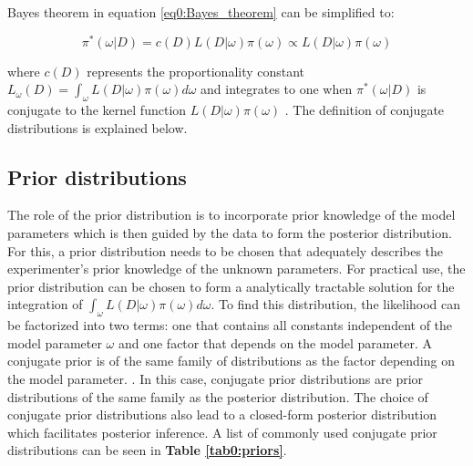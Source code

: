 Bayes theorem in equation \ref{eq0:Bayes_theorem} can be simplified to:

\begin{equation}
\pi^*(\omega|D)=c(D)L(D|\omega)\pi(\omega)\propto{}L(D|\omega)\pi(\omega)
\end{equation} 

where $c(D)$ represents the proportionality constant $L_\omega(D)=\int_\omega{}L(D|\omega)\pi(\omega)d\omega$ and integrates to one when $\pi^*(\omega|D)$ is conjugate to the kernel function $L(D|\omega)\pi(\omega)$ \citep{Bernardo2003, Raiffa1961}. The definition of conjugate distributions is explained below.  

\newpage

\subsection{Prior distributions}

The role of the prior distribution is to incorporate prior knowledge of the model parameters which is then guided by the data to form the posterior distribution. For this, a prior distribution needs to be chosen that adequately describes the experimenter's prior knowledge of the unknown parameters. For practical use, the prior distribution can be chosen to form a analytically tractable solution for the integration of $\int_\omega{}L(D|\omega)\pi(\omega)d\omega$. To find this distribution, the likelihood can be factorized into two terms: one that contains all constants independent of the model parameter $\omega$ and one factor that depends on the model parameter. A conjugate prior is of the same family of distributions as the factor depending on the model parameter. \citep{Fink1997}. In this case, conjugate prior distributions are prior distributions of the same family as the posterior distribution. The choice of conjugate prior distributions also lead to a closed-form posterior distribution which facilitates posterior inference. A list of commonly used conjugate prior distributions can be seen in \textbf{Table \ref{tab0:priors}}.

